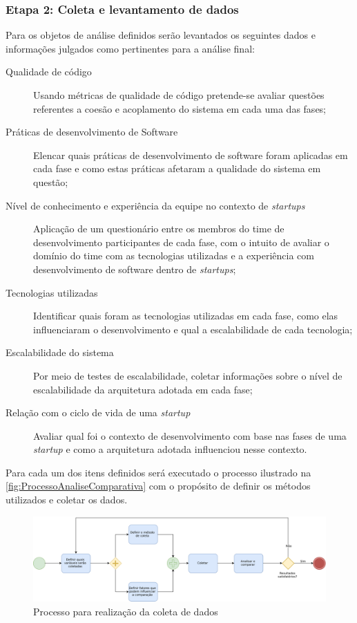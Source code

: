 \subsubsection{Etapa 2: Coleta e levantamento de dados}
\label{sec:Etapa2}

Para os objetos de análise definidos serão levantados os seguintes dados e informações
julgados como pertinentes para a análise final:

    \begin{description}
        \item [Qualidade de código] Usando métricas de qualidade de código pretende-se
        avaliar questões referentes a coesão e acoplamento do sistema em cada uma das
        fases;
        \item [Práticas de desenvolvimento de Software] Elencar quais práticas de
        desenvolvimento de software foram aplicadas em cada fase e como estas práticas
        afetaram a qualidade do sistema em questão;
        \item [Nível de conhecimento e experiência da equipe no contexto de \textit{startups}]
        Aplicação de um questionário entre os membros do time de desenvolvimento participantes
        de cada fase, com o intuito de avaliar o domínio do time com as tecnologias utilizadas
        e a experiência com desenvolvimento de software dentro de \textit{startups};
        \item [Tecnologias utilizadas] Identificar quais foram as tecnologias utilizadas em
        cada fase, como elas influenciaram o desenvolvimento e qual a escalabilidade de cada
        tecnologia;
        \item [Escalabilidade do sistema] Por meio de testes de escalabilidade, coletar
        informações sobre o nível de escalabilidade da arquitetura adotada em cada fase;
        \item [Relação com o ciclo de vida de uma \textit{startup}] Avaliar qual foi o
        contexto de desenvolvimento com base nas fases de uma \textit{startup} e como a
        arquitetura adotada influenciou nesse contexto.
    \end{description}

Para cada um dos itens definidos será executado o processo ilustrado na
\autoref{fig:ProcessoAnaliseComparativa} com o propósito de definir os métodos utilizados
e coletar os dados.

    \begin{figure}[h]
      \caption{Processo para realização da coleta de dados\label{fig:ProcessoAnaliseComparativa}}
      \centering
      \includegraphics[keepaspectratio=true,scale=0.5]{figuras/metodologiaAnalise.eps}
    \end{figure}

